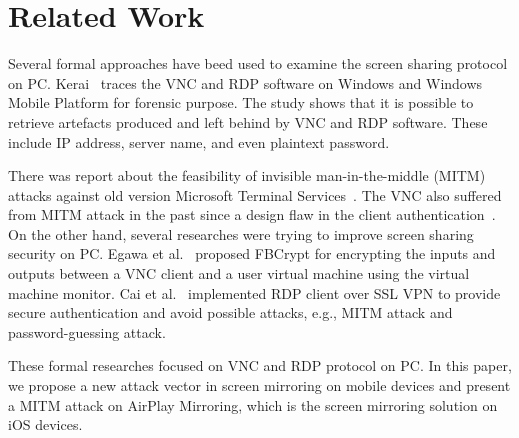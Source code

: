 \chapter{Related Work}

Several formal approaches have beed used to examine the screen sharing protocol on PC. Kerai~\cite{kerai2010remote, kerai2010tracing} traces the VNC and RDP software on Windows and Windows Mobile Platform for forensic purpose. The study shows that it is possible to retrieve artefacts produced and left behind by VNC and RDP software. These include IP address, server name, and even plaintext password.

There was report about the feasibility of invisible man-in-the-middle (MITM) attacks against old version Microsoft Terminal Services~\cite{RDPUgly}. The VNC also suffered from MITM attack in the past since a design flaw in the client authentication~\cite{WeakATTVNC}. On the other hand, several researches were trying to improve screen sharing security on PC. Egawa et al.~\cite{FBCrypt} proposed FBCrypt for encrypting the inputs and outputs between a VNC client and a user virtual machine using the virtual machine monitor. Cai et al.~\cite{RDPSSLVPN} implemented RDP client over SSL VPN to provide secure authentication and avoid possible attacks, e.g., MITM attack and password-guessing attack.

These formal researches focused on VNC and RDP protocol on PC. In this paper, we propose a new attack vector in screen mirroring on mobile devices and present a MITM attack on AirPlay Mirroring, which is the screen mirroring solution on iOS devices.
